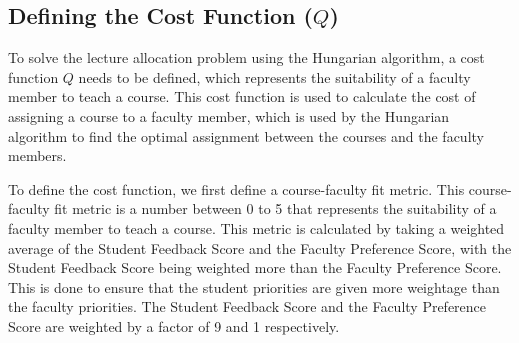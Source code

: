 

\subsection{Defining the Cost Function (\(Q\))}
\label{sec:defining_the_cost_function}

To solve the lecture allocation problem using the Hungarian algorithm, a cost function \(Q\) needs to be defined, which represents the suitability of a faculty member to teach a course. This cost function is used to calculate the cost of assigning a course to a faculty member, which is used by the Hungarian algorithm to find the optimal assignment between the courses and the faculty members.

To define the cost function, we first define a course-faculty fit metric. This course-faculty fit metric is a number between 0 to 5 that represents the suitability of a faculty member to teach a course. This metric is calculated by taking a weighted average of the Student Feedback Score and the Faculty Preference Score, with the Student Feedback Score being weighted more than the Faculty Preference Score. This is done to ensure that the student priorities are given more weightage than the faculty priorities. The Student Feedback Score and the Faculty Preference Score are weighted by a factor of 9 and 1 respectively.

